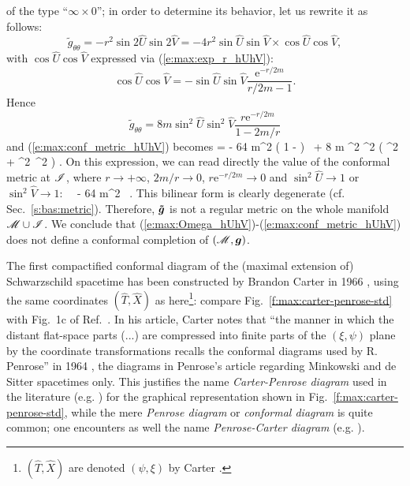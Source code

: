 of the type ``$\infty\times 0$''; in order to determine its behavior, let
us rewrite it as follows:
\[
    {\tilde{g}}_{\theta\theta} = -  r^2 \sin 2\hat{U} \sin 2\hat{V}
        = - 4 r^2 \sin\hat{U}\sin\hat{V} \times \cos\hat{U}\cos\hat{V},
\]
with $\cos\hat{U}\cos\hat{V}$ expressed via (\ref{e:max:exp_r_hUhV}):
\[
    \cos\hat{U}\cos\hat{V} = - \sin\hat{U} \sin\hat{V}
    \frac{\mathrm{e}^{-r/2m}}{r/2m - 1} .
\]
Hence
\[
    {\tilde{g}}_{\theta\theta} = 8 m \sin^2\hat{U} \sin^2\hat{V}
    \frac{ r \mathrm{e}^{-r/2m}}{1 - 2m/r}
\]
and (\ref{e:max:conf_metric_hUhV}) becomes
\be
    =
     - 64 m^2 \left( 1 -  \right)
    \dd {} \, \dd {}
     + 8 m \sin^2 \sin^2
     \left( \dd\th^2 + \sin^2\th\, \dd\ph^2 \right) .
\ee
On this expression, we can read directly the value of the conformal metric
at $\mathscr{I}$,  where $r\rightarrow +\infty$, $2m/r \rightarrow 0$,
$r \mathrm{e}^{-r/2m}\rightarrow 0$ and
$\sin^2\hat{U}\rightarrow 1$ or
$\sin^2\hat{V}\rightarrow 1$:
\be \label{e:max:conf_metric_scri}
    \ \stackrel{\scri}{=}\  - 64 m^2 \dd {} \, \dd {} .
\ee
This bilinear form is clearly degenerate (cf. Sec.~\ref{s:bas:metric}).
Therefore, $\bm{\tilde{g}}$ is not a
regular metric on the whole manifold $\mathscr{M}\cup\mathscr{I}$.
We conclude that (\ref{e:max:Omega_hUhV})-(\ref{e:max:conf_metric_hUhV}) does
not define a conformal completion of $(\mathscr{M},\bm{g})$.

\begin{hist} \label{h:max:CP-diag}
The first compactified conformal diagram of the (maximal extension of) Schwarzschild
spacetime has been constructed by Brandon Carter in 1966 \cite{Carte66}, using the same coordinates $(\hat{T},\hat{X})$ as here\footnote{
$(\hat{T},\hat{X})$ are denoted $(\psi,\xi)$ by Carter \cite{Carte66}.}: compare Fig.~\ref{f:max:carter-penrose-std} with Fig.~1c of Ref.~\cite{Carte66}.
In his article, Carter notes that ``the manner in which the distant flat-space
parts (...) are compressed into finite parts of the $(\xi,\psi)$ plane by the
coordinate transformations recalls the conformal diagrams used by R. Penrose''
in 1964 \cite{Penro64}, the diagrams in Penrose's article \cite{Penro64}
regarding Minkowski and de Sitter spacetimes only.
This justifies the name \emph{Carter-Penrose diagram}
used in the literature (e.g. \cite{FroloZ11}) for the graphical representation shown in Fig.~\ref{f:max:carter-penrose-std}, while the mere
\emph{Penrose diagram} or \emph{conformal diagram}
is quite common;
one encounters as well the name \emph{Penrose-Carter diagram}
(e.g. \cite{Poiss04}).
\end{hist}

